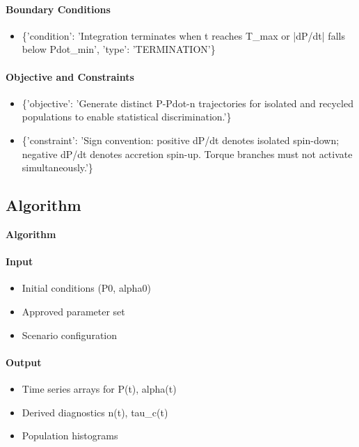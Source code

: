 \documentclass[11pt]{article}
\begin{document}
\paragraph{Boundary Conditions}
\begin{itemize}
\item \{'condition': 'Integration terminates when t reaches T\_max or |dP/dt| falls below Pdot\_min', 'type': 'TERMINATION'\}
\end{itemize}

\paragraph{Objective and Constraints}
\begin{itemize}
\item \{'objective': 'Generate distinct P-Pdot-n trajectories for isolated and recycled populations to enable statistical discrimination.'\}
\item \{'constraint': 'Sign convention: positive dP/dt denotes isolated spin-down; negative dP/dt denotes accretion spin-up. Torque branches must not activate simultaneously.'\}
\end{itemize}

\subsection{Algorithm}

\noindent\textbf{Algorithm}
\paragraph{Input}
\begin{itemize}
\item Initial conditions (P0, alpha0)
\item Approved parameter set
\item Scenario configuration
\end{itemize}
\paragraph{Output}
\begin{itemize}
\item Time series arrays for P(t), alpha(t)
\item Derived diagnostics n(t), tau\_c(t)
\item Population histograms
\end{itemize}
\end{document}
